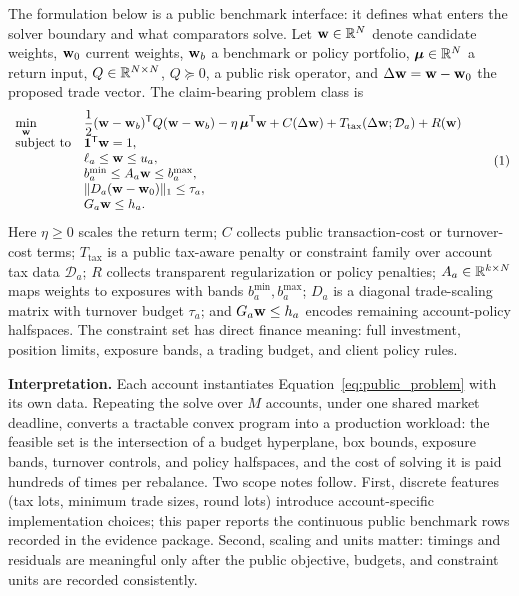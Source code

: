 \documentclass[10pt,a4paper]{extarticle}
\begin{document}
The formulation below is a public benchmark interface: it defines what enters
the solver boundary and what comparators solve. Let $\mathbf{w} \in \mathbb{R}^N$ denote
candidate weights, $\mathbf{w}_0$ current weights, $\mathbf{w}_b$ a benchmark or policy
portfolio, $\boldsymbol{\mu} \in \mathbb{R}^N$ a return input, $Q \in \mathbb{R}^{N\times N}$,
$Q \succeq 0$, a public risk operator, and $\Delta \mathbf{w}=\mathbf{w}-\mathbf{w}_0$ the proposed
trade vector. The claim-bearing problem class is
\[
\begin{array}{ll}
\displaystyle \min_{\mathbf{w}} &
  \displaystyle
  \frac{1}{2}(\mathbf{w}-\mathbf{w}_b)^{\mathsf{T}}Q(\mathbf{w}-\mathbf{w}_b)
  - \eta\,\boldsymbol{\mu}^{\mathsf{T}}\mathbf{w}
  + C(\Delta \mathbf{w})
  + T_{\mathrm{tax}}(\Delta \mathbf{w};\mathcal{D}_a)
  + R(\mathbf{w}) \\[3pt]
\text{subject to} &
  \mathbf{1}^{\mathsf{T}}\mathbf{w} = 1,\\
& \ell_a \leq \mathbf{w} \leq u_a,\\
& b_a^{\min} \leq A_a\mathbf{w} \leq b_a^{\max},\\
& \|D_a(\mathbf{w}-\mathbf{w}_0)\|_1 \leq \tau_a,\\
& G_a\mathbf{w} \leq h_a .
\end{array}
\tag{1}
\label{eq:public_problem}
\]
Here $\eta \geq 0$ scales the return term; $C$ collects public transaction-cost
or turnover-cost terms; $T_{\mathrm{tax}}$ is a public tax-aware penalty or
constraint family over account tax data $\mathcal{D}_a$; $R$ collects
transparent regularization or policy penalties; $A_a \in \mathbb{R}^{k\times N}$ maps
weights to exposures with bands $b_a^{\min}, b_a^{\max}$; $D_a$ is a diagonal
trade-scaling matrix with turnover budget $\tau_a$; and $G_a\mathbf{w} \leq h_a$
encodes remaining account-policy halfspaces. The constraint set has direct
finance meaning: full investment, position limits, exposure bands, a trading
budget, and client policy rules.

\textbf{Interpretation.} Each account instantiates
Equation~\eqref{eq:public_problem} with its own data. Repeating the solve over
$M$ accounts, under one shared market deadline, converts a tractable convex
program into a production workload: the feasible set is the intersection of a
budget hyperplane, box bounds, exposure bands, turnover controls, and policy
halfspaces, and the cost of solving it is paid hundreds of times per
rebalance. Two scope notes follow. First, discrete features (tax lots, minimum
trade sizes, round lots) introduce account-specific implementation choices;
this paper reports the continuous public benchmark rows recorded in the
evidence package. Second, scaling and units matter: timings and residuals are
meaningful only after the public objective, budgets, and constraint units are
recorded consistently.
\end{document}
